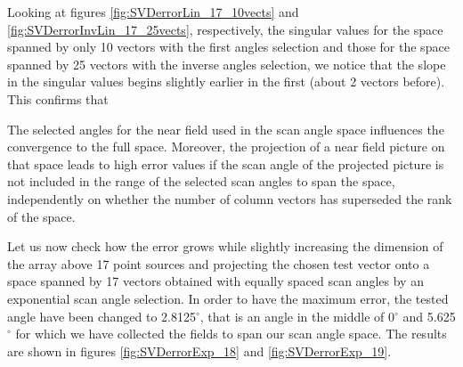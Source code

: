 Looking at figures \ref{fig:SVDerrorLin_17_10vects} and \ref{fig:SVDerrorInvLin_17_25vects}, respectively, the singular values for the space spanned by only 10 vectors with the first angles selection and those for the space spanned by 25 vectors with the inverse angles selection, we notice that the slope in the singular values begins slightly earlier in the first (about 2 vectors before). This confirms that

\begin{mycc}
\label{cc:SelectionSpace}
The selected angles for the near field used in the scan angle space influences the convergence to the full space. Moreover, the projection of a near field picture on that space leads to high error values if the scan angle of the projected picture is not included in the range of the selected scan angles to span the space, independently on whether the number of column vectors has superseded the rank of the space.
\end{mycc}

\par Let us now check how the error grows while slightly increasing the dimension of the array above 17 point sources and projecting the chosen test vector onto a space spanned by 17 vectors obtained with equally spaced scan angles by an exponential scan angle selection. In order to have the maximum error, the tested angle have been changed to 2.8125\ensuremath{^\circ}, that is an angle in the middle of 0\ensuremath{^\circ} and 5.625\ensuremath{^\circ} for which we have collected the fields to span our scan angle space. The results are shown in figures \ref{fig:SVDerrorExp_18} and \ref{fig:SVDerrorExp_19}.


